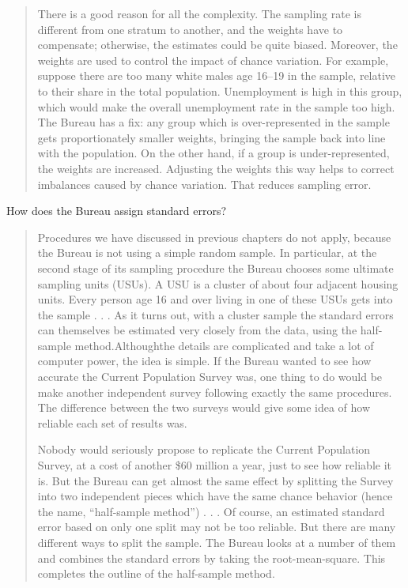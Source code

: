 \documentclass[
]{book}
\begin{document}
\begin{quote}
There is a good reason for all the complexity. The sampling rate is different from one stratum to another, and the weights have to compensate; otherwise, the estimates could be quite biased. Moreover, the weights are used to control the impact of chance variation. For example, suppose there are too many white males age 16--19 in the sample, relative to their share in the total population. Unemployment is high in this group, which would make the overall unemployment rate in the sample too high. The Bureau has a fix: any group which is over-represented in the sample gets proportionately smaller weights, bringing the sample back into line with the population. On the other hand, if a group is under-represented, the weights are increased. Adjusting the weights this way helps to correct imbalances caused by chance variation. That reduces sampling error.
\end{quote}

How does the Bureau assign standard errors?

\begin{quote}
Procedures we have discussed in previous chapters do not apply, because the Bureau is not using a
simple random sample. In particular, at the second stage of its sampling procedure the Bureau chooses some ultimate sampling units (USUs). A USU is a cluster of about four adjacent housing units. Every person age 16 and over living in one of these USUs gets into the sample . . . As it turns out, with a cluster sample the standard errors can themselves be estimated very closely from the data, using the half-sample method.Althoughthe details are complicated and take a lot of computer power, the idea is simple. If the Bureau wanted to see how accurate the Current Population Survey was, one thing to do would be make another independent survey following exactly the same procedures. The difference between the two surveys would give some idea of how reliable each set of results was.

Nobody would seriously propose to replicate the Current Population Survey, at a cost of another \$60 million a year, just to see how reliable it is. But the Bureau can get almost the same effect by splitting the Survey into two independent pieces which have the same chance behavior (hence the name, ``half-sample method'') . . . Of course, an estimated standard error based on only one split may not be too reliable. But there are many different ways to split the sample. The Bureau looks at a number of them and combines the standard errors by taking the root-mean-square. This completes the outline of the half-sample method.
\end{quote}
\end{document}
